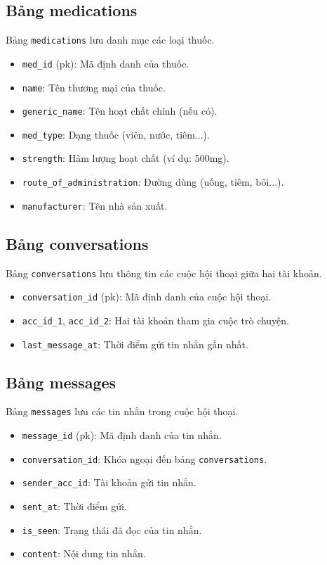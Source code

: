 \subsection{Bảng medications}
Bảng \texttt{medications} lưu danh mục các loại thuốc.
\begin{itemize}
  \item \texttt{med\_id} (pk): Mã định danh của thuốc.
  \item \texttt{name}: Tên thương mại của thuốc.
  \item \texttt{generic\_name}: Tên hoạt chất chính (nếu có).
  \item \texttt{med\_type}: Dạng thuốc (viên, nước, tiêm...).
  \item \texttt{strength}: Hàm lượng hoạt chất (ví dụ: 500mg).
  \item \texttt{route\_of\_administration}: Đường dùng (uống, tiêm, bôi...).
  \item \texttt{manufacturer}: Tên nhà sản xuất.
\end{itemize}

\subsection{Bảng conversations}
Bảng \texttt{conversations} lưu thông tin các cuộc hội thoại giữa hai tài khoản.
\begin{itemize}
  \item \texttt{conversation\_id} (pk): Mã định danh của cuộc hội thoại.
  \item \texttt{acc\_id\_1}, \texttt{acc\_id\_2}: Hai tài khoản tham gia cuộc trò chuyện.
  \item \texttt{last\_message\_at}: Thời điểm gửi tin nhắn gần nhất.
\end{itemize}

\subsection{Bảng messages}
Bảng \texttt{messages} lưu các tin nhắn trong cuộc hội thoại.
\begin{itemize}
  \item \texttt{message\_id} (pk): Mã định danh của tin nhắn.
  \item \texttt{conversation\_id}: Khóa ngoại đến bảng \texttt{conversations}.
  \item \texttt{sender\_acc\_id}: Tài khoản gửi tin nhắn.
  \item \texttt{sent\_at}: Thời điểm gửi.
  \item \texttt{is\_seen}: Trạng thái đã đọc của tin nhắn.
  \item \texttt{content}: Nội dung tin nhắn.
\end{itemize}


